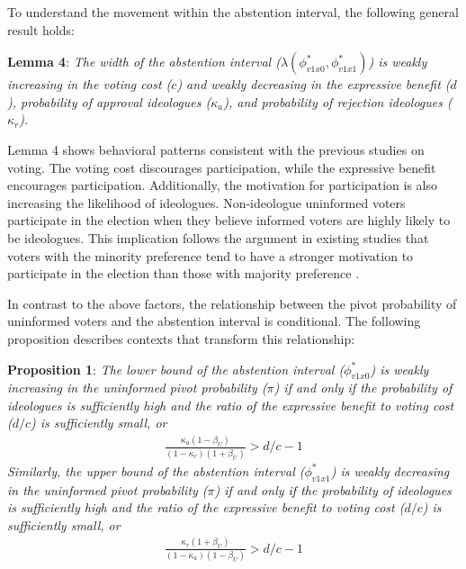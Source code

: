 \documentclass[letterpaper, 12pt]{article}
\begin{document}
    \par To understand the movement within the abstention interval, the following general result holds: 
    
    \noindent \textbf{Lemma 4}: \textit{The width of the abstention interval ($\lambda(\phi^*_{v1x0},  \phi^*_{v1x1})$) is weakly increasing in the voting cost ($c$) and weakly decreasing in the expressive benefit ($d$), probability of approval ideologues ($\kappa_a$), and probability of rejection ideologues ($\kappa_r$).}
    
    \noindent Lemma 4 shows behavioral patterns consistent with the previous studies on voting. The voting cost discourages participation, while the expressive benefit encourages participation. Additionally, the motivation for participation is also increasing the likelihood of ideologues. Non-ideologue uninformed voters participate in the election when they believe informed voters are highly likely to be ideologues. This implication follows the argument in existing studies that voters with the minority preference tend to have a stronger motivation to participate in the election than those with majority preference \citep{Taylor2010puin, Cantoni2017pras}.
    
    \par In contrast to the above factors, the relationship between the pivot probability of uninformed voters and the abstention interval is conditional. The following proposition describes contexts that transform this relationship:
    
    \noindent \textbf{Proposition 1}: \textit{The lower bound of the abstention interval ($\phi^*_{v1x0}$) is weakly increasing in the uninformed pivot probability ($\pi$) if and only if the probability of ideologues is sufficiently high and the ratio of the expressive benefit to voting cost ($d/c$) is sufficiently small, or}
    \begin{align}
    \frac{\kappa_{a} (1 - \beta_U)}{(1-\kappa_{r})(1+\beta_U)} > d/c - 1 \label{ecc1}
    \end{align}  
    \noindent \textit{Similarly, the upper bound of the abstention interval ($\phi^*_{v1x1}$) is weakly decreasing in the uninformed pivot probability ($\pi$) if and only if the probability of ideologues is sufficiently high and the ratio of the expressive benefit to voting cost ($d/c$) is sufficiently small, or}
    \begin{align}
    \frac{\kappa_{r} (1 + \beta_U)}{(1-\kappa_{a})(1-\beta_U)} > d/c - 1 \label{ecc2}
    \end{align}
    
\end{document}
